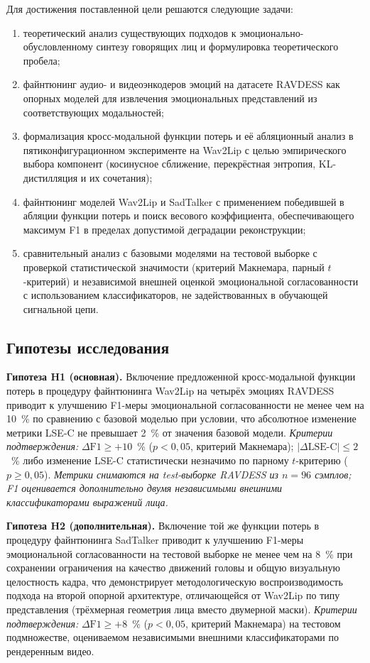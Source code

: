 \documentclass[a4paper, 12pt, oneside, openany]{article}
\begin{document}
Для достижения поставленной цели решаются следующие задачи:
\begin{enumerate}
\item теоретический анализ существующих подходов к эмоционально-обусловленному синтезу говорящих лиц и формулировка теоретического пробела;
\item файнтюнинг аудио- и видеоэнкодеров эмоций на датасете RAVDESS как опорных моделей для извлечения эмоциональных представлений из соответствующих модальностей;
\item формализация кросс-модальной функции потерь и её абляционный анализ в пятиконфигурационном эксперименте на Wav2Lip с целью эмпирического выбора компонент (косинусное сближение, перекрёстная энтропия, KL-дистилляция и их сочетания);
\item файнтюнинг моделей Wav2Lip и SadTalker с применением победившей в абляции функции потерь и поиск весового коэффициента, обеспечивающего максимум F1 в пределах допустимой деградации реконструкции;
\item сравнительный анализ с базовыми моделями на тестовой выборке с проверкой статистической значимости (критерий Макнемара, парный $t$-критерий) и независимой внешней оценкой эмоциональной согласованности с использованием классификаторов, не задействованных в обучающей сигнальной цепи.
\end{enumerate}

\subsection{Гипотезы исследования}

\textbf{Гипотеза H1 (основная).} Включение предложенной кросс-модальной функции потерь в процедуру файнтюнинга Wav2Lip на четырёх эмоциях RAVDESS приводит к улучшению F1-меры эмоциональной согласованности не менее чем на 10~\% по сравнению с базовой моделью при условии, что абсолютное изменение метрики LSE-C не превышает 2~\% от значения базовой модели. \textit{Критерии подтверждения:} $\Delta\text{F1} \geq +10$~\% ($p < 0{,}05$, критерий Макнемара); $|\Delta\text{LSE-C}| \leq 2$~\% либо изменение LSE-C статистически незначимо по парному $t$-критерию ($p \geq 0{,}05$). \textit{Метрики снимаются на test-выборке RAVDESS из $n=96$ сэмплов; F1 оценивается дополнительно двумя независимыми внешними классификаторами выражений лица.}

\textbf{Гипотеза H2 (дополнительная).} Включение той же функции потерь в процедуру файнтюнинга SadTalker приводит к улучшению F1-меры эмоциональной согласованности на тестовой выборке не менее чем на 8~\% при сохранении ограничения на качество движений головы и общую визуальную целостность кадра, что демонстрирует методологическую воспроизводимость подхода на второй опорной архитектуре, отличающейся от Wav2Lip по типу представления (трёхмерная геометрия лица вместо двумерной маски). \textit{Критерии подтверждения:} $\Delta\text{F1} \geq +8$~\% ($p < 0{,}05$, критерий Макнемара) на тестовом подмножестве, оцениваемом независимыми внешними классификаторами по рендеренным видео.
\end{document}
